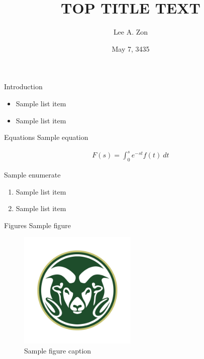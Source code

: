 \documentclass[10pt,xcolor={dvipsnames}]{beamer}
\title[BOTTOM TITLE TEXT] %
{
      \textbf{TOP TITLE TEXT}
}
\author[(AUTHOR BOTTOM NAME)] %
{
      Lee A. Zon
}
\institute[Colorado State University]
{
      Colorado State University
}
\date{May 7, 3435}
\begin{document}
{\1%
\begin{frame}
  \titlepage
\end{frame}}


\begin{frame}{Introduction}
  \lipsum[1]

  \begin{itemize}
    \item Sample list item
    \item Sample list item
  \end{itemize}
\end{frame}

\begin{frame}{Equations}
  Sample equation

  \begin{align}
    F(s) = \int_0^s e^{-st} f(t) \ dt
  \end{align}
  
  Sample enumerate
  \begin{enumerate}
    \item Sample list item
    \item Sample list item
  \end{enumerate}
\end{frame}

\begin{frame}{Figures}
  Sample figure

  \begin{figure}
    \centering
    \includegraphics[width=0.5\textwidth]{1.jpg}
    \caption{Sample figure caption}
    \label{fig:test_figure}
  \end{figure}
\end{frame}

{\1
\begin{frame}
\end{frame}}
\end{document}
